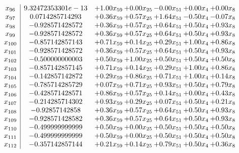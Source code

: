 \documentclass[8pt]{article}
\begin{document}
\[\begin{array}{c| c c@{\hskip 2pt} c@{\hskip 2pt} c@{\hskip 2pt} c@{\hskip 2pt} c@{\hskip 2pt} }
 x_{96}   &  9.32472353301e-13 & +  1.00 x_{59} & +  0.00 x_{25} & -0.00 x_{51} & +  0.00 x_{4} & +  0.00 x_{8}\\
 x_{97}   &  0.0714285714293 & +  0.36 x_{59} & +  0.57 x_{25} & +  1.64 x_{51} & -0.50 x_{4} & -0.07 x_{8}\\
 x_{98}   &  -0.928571428572 & +  0.36 x_{59} & +  0.57 x_{25} & +  0.64 x_{51} & +  0.50 x_{4} & +  0.93 x_{8}\\
 x_{99}   &  -0.928571428572 & +  0.36 x_{59} & +  0.57 x_{25} & +  0.64 x_{51} & +  0.50 x_{4} & +  0.93 x_{8}\\
 x_{100}   &  -0.857142857143 & +  0.71 x_{59} & +  0.14 x_{25} & +  0.29 x_{51} & +  1.00 x_{4} & +  0.86 x_{8}\\
 x_{101}   &  -0.928571428572 & +  0.36 x_{59} & +  0.57 x_{25} & +  0.64 x_{51} & +  0.50 x_{4} & +  0.93 x_{8}\\
 x_{102}   &  -0.500000000003 & +  0.50 x_{59} & +  1.00 x_{25} & +  0.50 x_{51} & +  0.50 x_{4} & +  0.50 x_{8}\\
 x_{103}   &  -0.857142857145 & +  0.71 x_{59} & +  0.14 x_{25} & +  0.29 x_{51} & +  1.00 x_{4} & +  0.86 x_{8}\\
 x_{104}   &  -0.142857142872 & +  0.29 x_{59} & +  0.86 x_{25} & +  0.71 x_{51} & +  1.00 x_{4} & +  0.14 x_{8}\\
 x_{105}   &  -0.785714285729 & +  0.07 x_{59} & +  0.71 x_{25} & +  0.93 x_{51} & +  0.50 x_{4} & +  0.79 x_{8}\\
 x_{106}   &  -0.428571428571 & +  0.86 x_{59} & +  0.57 x_{25} & +  0.14 x_{51} & +  0.00 x_{4} & +  0.43 x_{8}\\
 x_{107}   &  -0.214285714302 & +  0.93 x_{59} & +  0.29 x_{25} & +  0.07 x_{51} & +  0.50 x_{4} & +  0.21 x_{8}\\
 x_{108}   &  -0.92857142858 & +  0.36 x_{59} & +  0.57 x_{25} & +  0.64 x_{51} & +  0.50 x_{4} & +  0.93 x_{8}\\
 x_{109}   &  -0.928571428582 & +  0.36 x_{59} & +  0.57 x_{25} & +  0.64 x_{51} & +  0.50 x_{4} & +  0.93 x_{8}\\
 x_{110}   &  -0.499999999999 & +  0.50 x_{59} & +  0.00 x_{25} & +  0.50 x_{51} & +  0.50 x_{4} & +  0.50 x_{8}\\
 x_{111}   &  -0.499999999999 & +  0.50 x_{59} & +  0.00 x_{25} & +  0.50 x_{51} & +  0.50 x_{4} & +  0.50 x_{8}\\
 x_{112}   &  -0.357142857144 & +  0.21 x_{59} & +  0.14 x_{25} & +  0.79 x_{51} & +  0.50 x_{4} & +  0.36 x_{8}\\

\end{array}\]
\end{document}
